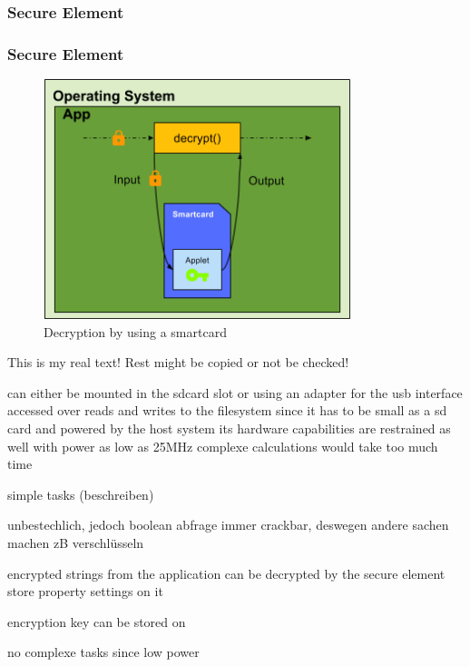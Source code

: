 \subsubsection{Secure Element} \label{section:counter-replace-encryption-key-local}
\subsubsection{Secure Element} \label{section:counter-replace-encryption-key-online}
\begin{figure}[h]
    \centering
    \includegraphics[width=0.8\textwidth]{data/encryptionKeySmart.png}
    \caption{Decryption by using a smartcard}
    \label{fig:encryptionKeySmart}
\end{figure}

This is my real text! Rest might be copied or not be checked!

can either be mounted in the sdcard slot or using an adapter for the usb interface
accessed over reads and writes to the filesystem
since it has to be small as a sd card and powered by the host system its hardware capabilities are restrained as well \cite{stSe} with power as low as 25MHz complexe calculations would take too much time

simple tasks (beschreiben)

unbestechlich, jedoch boolean abfrage immer crackbar, deswegen andere sachen machen zB verschlüsseln

encrypted strings from the application can be decrypted by the secure element
store property settings on it

encryption key can be stored on

no complexe tasks since low power


